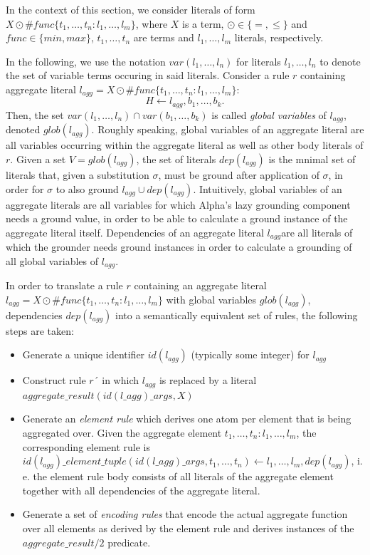 In the context of this section, we consider literals of form $X \odot \#\mathit{func}\{t_1,\ldots,t_n : l_1,\ldots,l_m\}$, where $X$ is a term, $\odot \in \{=,\leq\}$ and $\mathit{func} \in \{\mathit{min},\mathit{max}\}$, $t_1,\ldots,t_n$ are terms and $l_1,\ldots,l_m$ literals, respectively.

\begin{definition}
In the following, we use the notation $var(l_1,\ldots,l_n)$ for literals $l_1,\ldots,l_n$ to denote the set of variable terms occuring in said literals. Consider a rule $r$ containing aggregate literal $l_{agg} =  X \odot \#\mathit{func}\{t_1,\ldots,t_n : l_1,\ldots,l_m\}$:
\[
    H \leftarrow l_{agg}, b_1,\ldots,b_k.
\]
Then, the set $var(l_1,\ldots,l_n) \cap var(b_1,\ldots, b_k)$ is called \emph{global variables} of $l_{agg}$, denoted $glob(l_{agg})$. Roughly speaking, global variables of an aggregate literal are all variables occurring within the aggregate literal as well as other body literals of $r$. Given a set $V = glob(l_{agg})$, the set of literals $dep(l_{agg})$ is the mnimal set of literals that, given a substitution $\sigma$, must be ground after application of $\sigma$, in order for $\sigma$ to also ground $l_{agg} \cup dep(l_{agg})$.
Intuitively, global variables of an aggregate literals are all variables for which Alpha's lazy grounding component needs a ground value, in order to be able to calculate a ground instance of the aggregate literal itself. Dependencies of an aggregate literal $l_{agg}$are all literals of which the grounder needs ground instances in order to calculate a grounding of all global variables of $l_{agg}$.
\end{definition} 

In order to translate a rule $r$ containing an aggregate literal $l_{agg} = X \odot \#\mathit{func}\{t_1,\ldots,t_n : l_1,\ldots,l_m\}$ with global variables $glob(l_{agg})$, dependencies $dep(l_{agg})$ into a semantically equivalent set of rules, the following steps are taken:
\begin{itemize}
    \item Generate a unique identifier $id(l_{agg})$ (typically some integer) for $l_{agg}$
    \item Construct rule $r´$ in which $l_{agg}$ is replaced by a literal $aggregate\_result(id(l\_{agg})\_args, X)$
    \item Generate an \emph{element rule} which derives one atom per element that is being aggregated over. Given the aggregate element $t_1,\ldots,t_n : l_1,\ldots,l_m$, the corresponding element rule is $id(l_{agg})\_element\_tuple(id(l\_{agg})\_args, t_1,\ldots,t_n) \leftarrow l_1,\ldots,l_m, dep(l_{agg})$, i. e. the element rule body consists of all literals of the aggregate element together with all dependencies of the aggregate literal.
    \item Generate a set of \emph{encoding rules} that encode the actual aggregate function over all elements as derived by the element rule and derives instances of the $aggregate\_result/2$ predicate.
\end{itemize}     

